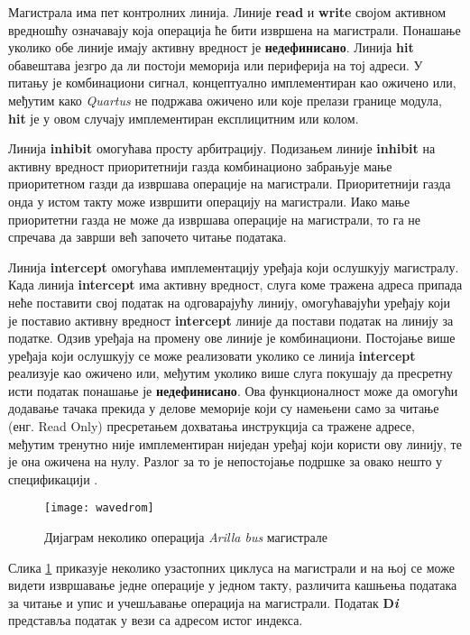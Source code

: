 Магистрала има пет контролних линија. Линије \textbf{read} и \textbf{write} својом активном вредношћу означавају која операција ће бити извршена на магистрали. Понашање уколико обе линије имају активну вредност је \textbf{недефинисано}. Линија \textbf{hit} обавештава језгро да ли постоји меморија или периферија на тој адреси. У питању је комбинациони сигнал, концептуално имплементиран као ожичено или, међутим како \textit{Quartus} не подржава ожичено или које прелази границе модула, \textbf{hit} је у овом случају имплементиран експлицитним или колом.

Линија \textbf{inhibit} омогућава просту арбитрацију. Подизањем линије \textbf{inhibit} на активну вредност приоритетнији газда комбинационо забрањује мање приоритетном газди да извршава операције на магистрали. Приоритетнији газда онда у истом такту може извршити операцију на магистрали. Иако мање приоритетни газда не може да извршава операције на магистрали, то га не спречава да заврши већ започето читање података.

Линија \textbf{intercept} омогућава имплементацију уређаја који ослушкују магистралу. Када линија \textbf{intercept} има активну вредност, слуга коме тражена адреса припада неће поставити свој податак на одговарајућу линију, омогућавајући уређају који је поставио активну вредност \textbf{intercept} линије да постави податак на линију за податке. Одзив уређаја на промену ове линије је комбинациони. Постојање више уређаја који ослушкују се може реализовати уколико се линија \textbf{intercept} реализује као ожичено или, међутим уколико више слуга покушају да пресретну исти податак понашање је \textbf{недефинисано}. Ова функционалност може да омогући додавање тачака прекида у делове меморије који су намењени само за читање (енг. Read Only) пресретањем дохватања инструкција са тражене адресе, међутим тренутно није имплементиран ниједан уређај који користи ову линију, те је она ожичена на нулу. Разлог за то је непостојање подршке за овако нешто у спецификацији \cite{debug_spec}.

\begin{figure}[h!]
	\centering
	\texttt{[image: wavedrom]}
	\caption{Дијаграм неколико операција \textit{Arilla bus} магистрале}
	\label{fig:busop}
\end{figure}

Слика \ref{fig:busop} приказује неколико узастопних циклуса на магистрали и на њој се може видети извршавање једне операције у једном такту, различита кашњења података за читање и упис и учешљавање операција на магистрали. Податак \textbf{D\textit{i}} представља податак у вези са адресом истог индекса.

